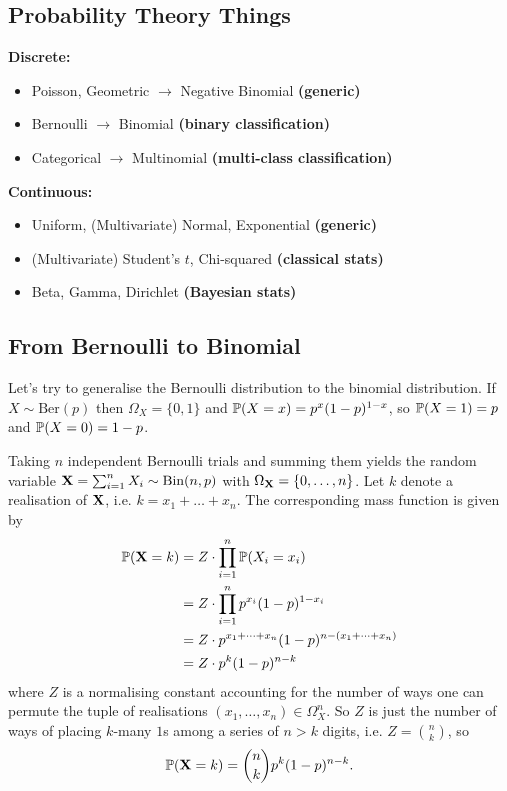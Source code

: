 \documentclass[11pt]{article}
\begin{document}
\newpage
\begin{appendices}

\section{Probability Theory Things}

\begin{tcolorbox}[colback=c5]
    \textbf{Discrete:}
    \begin{itemize}
        \item Poisson, Geometric $\rightarrow$ Negative Binomial \textbf{(generic)}
        \item Bernoulli $\rightarrow$ Binomial \textbf{(binary classification)}
        \item Categorical $\rightarrow$ Multinomial \textbf{(multi-class classification)}
    \end{itemize}
\end{tcolorbox}

\begin{tcolorbox}[colback=c9]
    \textbf{Continuous:}
    \begin{itemize}
        \item Uniform, (Multivariate) Normal, Exponential \textbf{(generic)}
        \item (Multivariate) Student's $t$, Chi-squared \textbf{(classical stats)}
        \item Beta, Gamma, Dirichlet \textbf{(Bayesian stats)}
    \end{itemize}
\end{tcolorbox}

\subsection{From Bernoulli to Binomial}
Let's try to generalise the Bernoulli distribution to the binomial distribution. If $X\sim\text{Ber}(p)$ then $\Omega_X=\{0,1\}$ and $\P(X=x)=p^x(1-p)^{1-x}$, so $\P(X=1)=p$ and $\P(X=0)=1-p$.

Taking $n$ independent Bernoulli trials and summing them yields the random variable $\X=\sum_{i=1}^nX_i\sim\text{Bin}(n,p)$ with $\OX=\{0,\dots,n\}$. Let $k$ denote a realisation of $\X$, i.e. $k=x_1+\dots+x_n$. The corresponding mass function is given by
\begin{align*}
    \P(\X=k)
    &=
    Z\cdot\prod_{i=1}^n\P(X_i=x_i)\\
    &=
    Z\cdot\prod_{i=1}^np^{x_i}(1-p)^{1-x_i}\\
    &=
    Z\cdot p^{x_1+\dots+x_n}(1-p)^{n-(x_1+\dots+x_n)}\\
    &=
    Z\cdot p^k(1-p)^{n-k}
\end{align*}
where $Z$ is a normalising constant accounting for the number of ways one can permute the tuple of realisations $(x_1,\dots,x_n)\in\Omega_{X}^n$. So $Z$ is just the number of ways of placing $k$-many $1$s among a series of $n>k$ digits, i.e. $Z=\binom{n}{k}$, so
$$
\P(\X=k)
=
\binom{n}{k}p^k(1-p)^{n-k}.
$$


\end{appendices}
\end{document}
